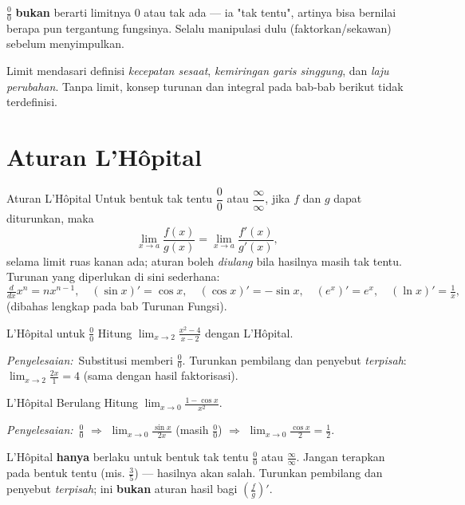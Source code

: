 \documentclass[11pt,a4paper]{report}
\theoremstyle{gaya}
\newcommand{\jawab}{\par\smallskip\noindent\textit{\textcolor{oranye}{Penyelesaian:}}\ }
\begin{document}
\begin{kesalahan}
$\tfrac00$ \textbf{bukan} berarti limitnya $0$ atau tak ada --- ia "tak tentu", artinya bisa bernilai berapa pun tergantung fungsinya. Selalu manipulasi dulu (faktorkan/sekawan) sebelum menyimpulkan.
\end{kesalahan}

\begin{dunianyata}
Limit mendasari definisi \emph{kecepatan sesaat}, \emph{kemiringan garis singgung}, dan \emph{laju perubahan}. Tanpa limit, konsep turunan dan integral pada bab-bab berikut tidak terdefinisi.
\end{dunianyata}

\section{Aturan L'Hôpital}
\begin{konsep}{Aturan L'Hôpital}
Untuk bentuk tak tentu $\dfrac00$ atau $\dfrac{\infty}{\infty}$, jika $f$ dan $g$ dapat diturunkan, maka
\[
\lim_{x\to a}\frac{f(x)}{g(x)}=\lim_{x\to a}\frac{f'(x)}{g'(x)},
\]
selama limit ruas kanan ada; aturan boleh \emph{diulang} bila hasilnya masih tak tentu. Turunan yang diperlukan di sini sederhana:
\[
\tfrac{d}{dx}x^n=nx^{n-1},\quad (\sin x)'=\cos x,\quad (\cos x)'=-\sin x,\quad (e^x)'=e^x,\quad (\ln x)'=\tfrac1x,
\]
(dibahas lengkap pada bab Turunan Fungsi).
\end{konsep}

\begin{contoh}{L'Hôpital untuk $\tfrac00$}
Hitung $\displaystyle\lim_{x\to2}\frac{x^2-4}{x-2}$ dengan L'Hôpital.

\jawab Substitusi memberi $\tfrac00$. Turunkan pembilang dan penyebut \emph{terpisah}:
$\displaystyle\lim_{x\to2}\frac{2x}{1}=4$ (sama dengan hasil faktorisasi).
\end{contoh}

\begin{contoh}{L'Hôpital Berulang}
Hitung $\displaystyle\lim_{x\to0}\frac{1-\cos x}{x^2}$.

\jawab $\tfrac00$ $\Rightarrow$ $\displaystyle\lim_{x\to0}\frac{\sin x}{2x}$ (masih $\tfrac00$) $\Rightarrow$ $\displaystyle\lim_{x\to0}\frac{\cos x}{2}=\frac12.$
\end{contoh}

\begin{kesalahan}
L'Hôpital \textbf{hanya} berlaku untuk bentuk tak tentu $\tfrac00$ atau $\tfrac\infty\infty$. Jangan terapkan pada bentuk tentu (mis. $\tfrac35$) --- hasilnya akan salah. Turunkan pembilang dan penyebut \emph{terpisah}; ini \textbf{bukan} aturan hasil bagi $\left(\tfrac fg\right)'$.
\end{kesalahan}
\end{document}
